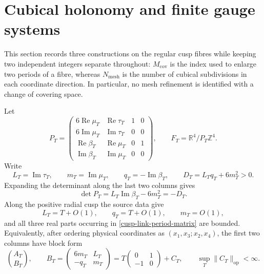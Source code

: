 \section{Cubical holonomy and finite gauge systems}
\label{cusp-link-section}

This section records three constructions on the regular cusp fibres while
keeping two independent integers separate throughout:
\(M_{\mathrm{cov}}\) is the index used to enlarge two periods of a fibre,
whereas \(N_{\mathrm{mesh}}\) is the number of cubical subdivisions in each
coordinate direction.  In particular, no mesh refinement is identified with
a change of covering space.

Let
\begin{equation}
 P_T=
 \begin{pmatrix}
  6\operatorname{Re}\mu_T&\operatorname{Re}\tau_T&1&0\\
  6\operatorname{Im}\mu_T&\operatorname{Im}\tau_T&0&0\\
  \operatorname{Re}\beta_T&\operatorname{Re}\mu_T&0&1\\
  \operatorname{Im}\beta_T&\operatorname{Im}\mu_T&0&0
 \end{pmatrix},
 \qquad
 F_T=\mathbb R^4/P_T\mathbb Z^4.
 \label{cusp-link-period-matrix}
\end{equation}
Write
\begin{equation}
 L_T=\operatorname{Im}\tau_T,
 \qquad m_T=\operatorname{Im}\mu_T,
 \qquad q_T=-\operatorname{Im}\beta_T,
 \qquad D_T=L_Tq_T+6m_T^2>0.
 \label{cusp-link-radial-data}
\end{equation}
Expanding the determinant along the last two columns gives
\[
 \det P_T=L_T\operatorname{Im}\beta_T-6m_T^2=-D_T.
\]
Along the positive radial cusp the source data give
\begin{equation}
 L_T=T+O(1),\qquad q_T=T+O(1),\qquad m_T=O(1),
 \label{cusp-link-cusp-asymptotics}
\end{equation}
and all three real parts occurring in \eqref{cusp-link-period-matrix} are
bounded.  Equivalently, after ordering physical coordinates as
\((x_1,x_3;x_2,x_4)\), the first two columns have block form
\begin{equation}
 \binom{A_T}{B_T},\qquad
 B_T=
 \begin{pmatrix}6m_T&L_T\\-q_T&m_T\end{pmatrix}
 =T\begin{pmatrix}0&1\\-1&0\end{pmatrix}+C_T,
 \qquad \sup_T\lVert C_T\rVert_{\mathrm{op}}<\infty.
 \label{cusp-link-block-form}
\end{equation}

